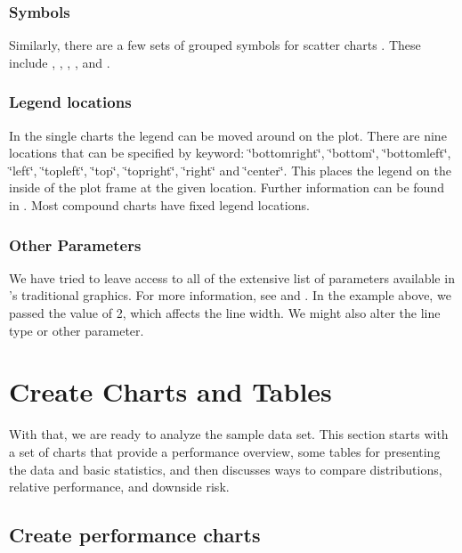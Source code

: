 \documentclass[12pt,letterpaper,english]{article}
\begin{document}
\subsubsection*{Symbols}

Similarly, there are a few sets of grouped symbols for scatter charts . These
include , , ,
, and .


\subsubsection*{Legend locations}

In the single charts the legend can be moved around on the plot. There
are nine locations that can be specified by keyword: \char`\"{}bottomright\char`\"{},
\char`\"{}bottom\char`\"{}, \char`\"{}bottomleft\char`\"{}, \char`\"{}left\char`\"{},
\char`\"{}topleft\char`\"{}, \char`\"{}top\char`\"{}, \char`\"{}topright\char`\"{},
\char`\"{}right\char`\"{} and \char`\"{}center\char`\"{}. This places
the legend on the inside of the plot frame at the given location.
Further information can be found in .
Most compound charts have fixed legend locations.


\subsubsection*{Other Parameters}

We have tried to leave access to all of the extensive list of parameters
available in \R's traditional graphics. For more information, see
 and . In the
example above, we passed  the value of 2, which
affects the line width. We might also alter the line type or other
parameter.


\section{Create Charts and Tables}

With that, we are ready to analyze the sample data set. This section
starts with a set of charts that provide a performance overview, some
tables for presenting the data and basic statistics, and then discusses
ways to compare distributions, relative performance, and downside
risk.


\subsection{Create performance charts}
\end{document}
